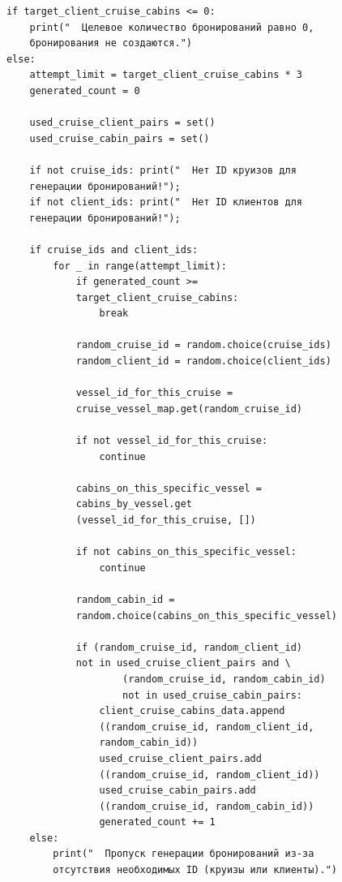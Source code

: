 \documentclass[11pt,a4paper,final]{article}
\begin{document}
{\begin{verbatim}
            if target_client_cruise_cabins <= 0:
                print("  Целевое количество бронирований равно 0, 
                бронирования не создаются.")
            else:
                attempt_limit = target_client_cruise_cabins * 3
                generated_count = 0

                used_cruise_client_pairs = set()
                used_cruise_cabin_pairs = set()

                if not cruise_ids: print("  Нет ID круизов для 
                генерации бронирований!");
                if not client_ids: print("  Нет ID клиентов для 
                генерации бронирований!");

                if cruise_ids and client_ids:
                    for _ in range(attempt_limit):
                        if generated_count >= 
                        target_client_cruise_cabins:
                            break

                        random_cruise_id = random.choice(cruise_ids)
                        random_client_id = random.choice(client_ids)

                        vessel_id_for_this_cruise = 
                        cruise_vessel_map.get(random_cruise_id)

                        if not vessel_id_for_this_cruise:
                            continue

                        cabins_on_this_specific_vessel = 
                        cabins_by_vessel.get
                        (vessel_id_for_this_cruise, [])

                        if not cabins_on_this_specific_vessel:
                            continue

                        random_cabin_id = 
                        random.choice(cabins_on_this_specific_vessel)

                        if (random_cruise_id, random_client_id) 
                        not in used_cruise_client_pairs and \
                                (random_cruise_id, random_cabin_id) 
                                not in used_cruise_cabin_pairs:
                            client_cruise_cabins_data.append
                            ((random_cruise_id, random_client_id, 
                            random_cabin_id))
                            used_cruise_client_pairs.add
                            ((random_cruise_id, random_client_id))
                            used_cruise_cabin_pairs.add
                            ((random_cruise_id, random_cabin_id))
                            generated_count += 1
                else:
                    print("  Пропуск генерации бронирований из-за
                    отсутствия необходимых ID (круизы или клиенты).")


\end{verbatim}}
\end{document}
